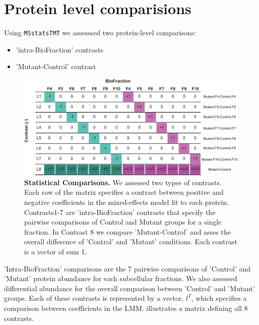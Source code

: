 \documentclass[11pt]{elife}\usepackage[]{graphicx}\usepackage[]{color}
\begin{document}
\section{Protein level comparisions}

Using \texttt{MSstatsTMT} we assesssed two protein-level comparisons:

\begin{itemize}
	\item 'intra-BioFraction' contrasts 
	\item 'Mutant-Control' contrast 
\end{itemize}

\begin{figure}[h!] %
  \begin{fullwidth}
  \begin{center}
	  \includegraphics[width=0.9\paperwidth,keepaspectratio]{contrasts}
	  \caption{\textbf{Statistical Comparisons.} We assessed two types of
	  contrasts. Each row of the matrix specifies a contrast between
	  positive and negative coefficients in the mixed-effects model fit to
	  each protein. Contrasts1-7 are 'intra-BioFraction' contrasts that
	  specify the pairwise comparisons of Control and Mutant groups for a
	  single fraction. In Contrast 8 we compare 'Mutant-Control' and asses
	  the overall difference of 'Control' and 'Mutant' conditions.  Each
	  contrast is a vector of sum 1.}
	  \label{fig:contrasts}
  \end{center}
  \end{fullwidth}
\end{figure}


'Intra-BioFraction' comparisons are the 7 pairwise comparisons of 'Control' and
'Mutant' protein abundance for each subcellular fractions. We
also assessed differential abundance for the overall comparison between 'Control'
and 'Mutant' groups. Each of these contrasts is represented by a vector, $l^T$, 
which specifies a comparison between coefficients in the LMM. 
illustrates a matrix defining all 8 contrasts. 
\end{document}

